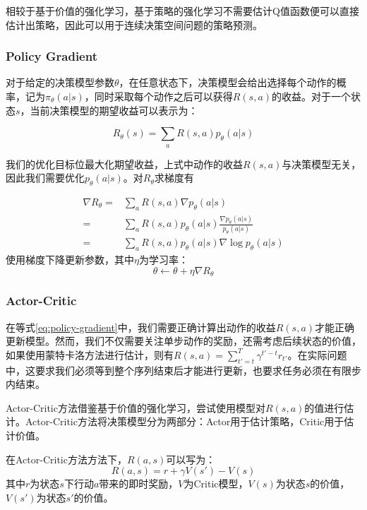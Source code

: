 \documentclass{article}
\begin{document}
相较于基于价值的强化学习，基于策略的强化学习不需要估计Q值函数便可以直接估计出策略，因此可以用于连续决策空间问题的策略预测。

\subsubsection{Policy Gradient}

对于给定的决策模型参数$\theta$，在任意状态下，决策模型会给出选择每个动作的概率，记为$\pi_{\theta}(a|s)$，同时采取每个动作之后可以获得$R(s,a)$的收益。对于一个状态$s$，当前决策模型的期望收益可以表示为：

\begin{equation}
R_{\theta}(s) = \sum_{a} R(s,a)p_{\theta}(a|s)
\end{equation}

我们的优化目标位最大化期望收益，上式中动作的收益$R(s,a)$与决策模型无关，因此我们需要优化$p_{\theta}(a|s)$。对$R_{\theta}$求梯度有


\begin{align}
	\nabla R_{\theta} =& \sum_{a} R(s,a)\nabla p_{\theta}(a|s) \\
	=& \sum_{a} R(s,a)p_{\theta}(a|s) \frac{\nabla p_{\theta}(a|s)}{p_{\theta}(a|s)}\\
	=& \sum_{a} R(s,a)p_{\theta}(a|s)\nabla\log p_{\theta}(a|s)
	\label{eq:policy-gradient}
\end{align}
使用梯度下降更新参数，其中$\eta$为学习率：
\begin{equation}
\theta \leftarrow \theta + \eta \nabla R_\theta
\end{equation}

\subsubsection{Actor-Critic}

在等式\ref{eq:policy-gradient}中，我们需要正确计算出动作的收益$R(s,a)$才能正确更新模型。然而，我们不仅需要关注单步动作的奖励，还需考虑后续状态的价值，如果使用蒙特卡洛方法进行估计，则有$R(s,a)=\sum_{t'=t}^{T} \gamma^{t'-t} r_{t'}$。在实际问题中，这要求我们必须等到整个序列结束后才能进行更新，也要求任务必须在有限步内结束。

Actor-Critic方法借鉴基于价值的强化学习，尝试使用模型对$R(s,a)$的值进行估计。Actor-Critic方法将决策模型分为两部分：Actor用于估计策略，Critic用于估计价值。

在Actor-Critic方法方法下，$R(a,s)$可以写为：
\begin{equation}
R(a,s) = r + \gamma V(s') - V(s)
\end{equation}
其中$r$为状态$s$下行动$a$带来的即时奖励，$V$为Critic模型，$V(s)$为状态$s$的价值，$V(s')$为状态$s'$的价值。
\end{document}
